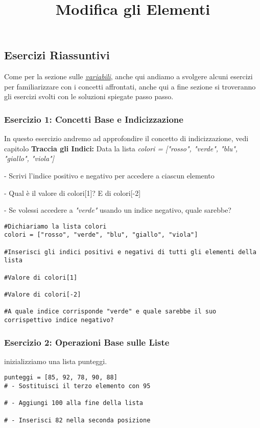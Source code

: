 \clearpage

\subsection{Esercizi Riassuntivi}
Come per la sezione sulle \textit{\hyperref[EserciziFondamenti]{variabili}}, anche qui andiamo a svolgere alcuni esercizi per familiarizzare con i concetti affrontati, anche qui a fine sezione si troveranno gli esercizi svolti con le soluzioni spiegate passo passo.

\subsubsection{Esercizio 1: Concetti Base e Indicizzazione}\label{Esercizio1Liste}
In questo esercizio andremo ad approfondire il concetto di indicizzazione, vedi capitolo 
    \newline
\textbf{Traccia gli Indici:} Data la lista \textit{colori = ["rosso", "verde", "blu", "giallo", "viola"]}

-   Scrivi l'indice positivo e negativo per accedere a ciascun elemento

-   Qual è il valore di colori[1]? E di colori[-2]

-   Se volessi accedere a \textit{"verde"} usando un indice negativo, quale sarebbe?

\vspace{0,5cm}
\begin{lstlisting}
#Dichiariamo la lista colori
colori = ["rosso", "verde", "blu", "giallo", "viola"]

#Inserisci gli indici positivi e negativi di tutti gli elementi della lista

#Valore di colori[1]

#Valore di colori[-2]

#A quale indice corrisponde "verde" e quale sarebbe il suo corrispettivo indice negativo?

\end{lstlisting}

\subsubsection{Esercizio 2: Operazioni Base sulle Liste}\label{Esercizio2Liste}
\title{\textbf{Modifica gli Elementi}}
inizializziamo una lista punteggi.

\begin{lstlisting}
punteggi = [85, 92, 78, 90, 88]
# - Sostituisci il terzo elemento con 95

# - Aggiungi 100 alla fine della lista

# - Inserisci 82 nella seconda posizione

\end{lstlisting}

